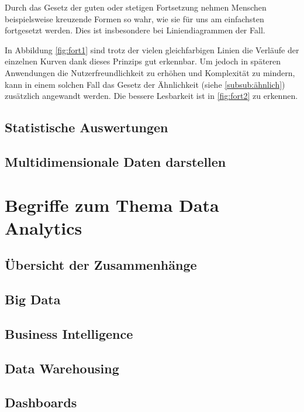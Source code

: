 Durch das Gesetz der guten oder stetigen Fortsetzung nehmen Menschen beispielsweise kreuzende Formen so wahr, wie sie für uns am einfachsten fortgesetzt werden.
Dies ist insbesondere bei Liniendiagrammen der Fall.

In Abbildung \ref{fig:fort1} sind trotz der vielen gleichfarbigen Linien die Verläufe der einzelnen Kurven dank dieses Prinzips gut erkennbar.
Um jedoch in späteren Anwendungen die Nutzerfreundlichkeit zu erhöhen und Komplexität zu mindern, kann in einem solchen Fall das Gesetz der Ähnlichkeit (siehe \ref{subsub:ähnlich}) zusätzlich angewandt werden.
Die bessere Lesbarkeit ist in \ref{fig:fort2} zu erkennen.

\subsection{Statistische Auswertungen}
\subsection{Multidimensionale Daten darstellen}

\section{Begriffe zum Thema Data Analytics}
\subsection{Übersicht der Zusammenhänge}
\subsection{Big Data}
\subsection{Business Intelligence}
\subsection{Data Warehousing}
\subsection{Dashboards}

